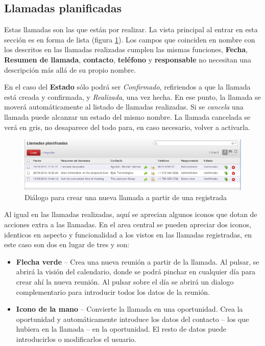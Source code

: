 \subsection{Llamadas planificadas}

Estas llamadas son las que están por realizar. La vista principal al entrar en esta sección es en forma de lista (figura \ref{ven:llaplanificadas}). Los campos que coinciden en nombre con los descritos en las llamadas realizadas cumplen las mismas funciones,
\textbf{Fecha}, \textbf{Resumen de llamada}, \textbf{contacto}, \textbf{teléfono} y \textbf{responsable} no necesitan una descripción más allá de su propio nombre.

En el caso del \textbf{Estado} sólo podrá ser \emph{Confirmado}, refiriendos a que la llamada está creada y confirmada, y \emph{Realizada}, una vez hecha. En ese punto, la llamada se moverá automáticamente al listado de llamadas realizadas. Si se \emph{cancela} una llamada puede alcanzar un estado del mismo nombre. La llamada cancelada se verá en gris, no desaparece del todo para, en caso necesario, volver a activarla.

\begin{figure}[H]
\includegraphics[width=\textwidth]{ventas/img/ven_llaplanificadas.png}
\caption{Diálogo para crear una nueva llamada a partir de una registrada}
\label{ven:llaplanificadas}
\end{figure}

Al igual en las llamadas realizadas, aquí se aprecian algunos iconos que dotan de acciones extra a las llamadas. En el area central se
pueden apreciar dos iconos, identicos en aspecto y funcionalidad a los vistos en las llamadas registradas, en este caso son dos en lugar 
de tres y son:

\begin{itemize}
  \item \textbf{Flecha verde} -- Crea una nueva reunión a partir de la llamada. Al pulsar, se abrirá la visión del calendario, donde se 
                           podrá pinchar en cualquier día para crear ahí la nueva reunión. Al pulsar sobre el día se abrirá un dialogo 
                           complementario para introducir todos los datos de la reunión.
  \item \textbf{Icono de la mano} -- Convierte la llamada en una oportunidad. Crea la oportunidad y automáticamente introduce los datos
                           del contacto -- los que hubiera en la llamada -- en la oportunidad. El resto de datos puede introducirlos o
                           modificarlos el usuario.
\end{itemize}

